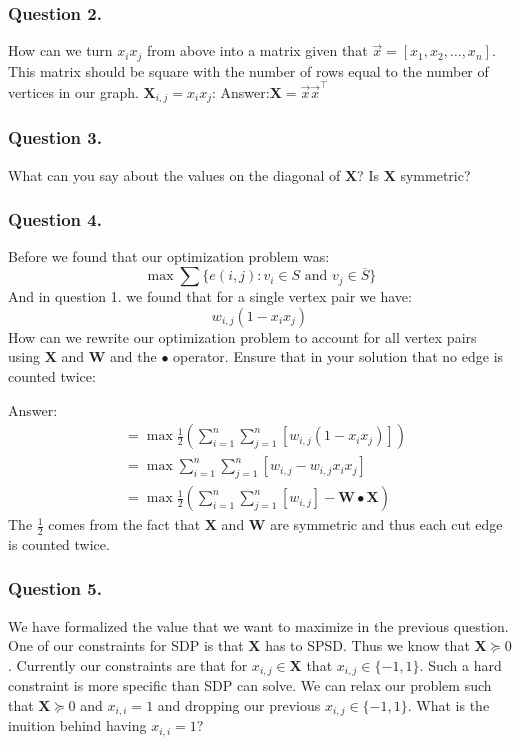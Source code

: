 \documentclass{article}
\begin{document}
\subsubsection{Question 2.}
How can we turn \( x_i x_j \) from above into a matrix given that \( \vec{x} = [x_1, x_2, \ldots, x_n] \). This matrix should be square with the number of rows equal to the number of vertices in our graph. \( \mathbf{X}_{i, j} = x_i x_j \):
Answer:\( \mathbf{X} = \vec{x} \vec{x}^\top \)

\subsubsection{Question 3.}
What can you say about the values on the diagonal of \( \mathbf{X} \)? Is \( \mathbf{X} \) symmetric?

\subsubsection{Question 4.}
Before we found that our optimization problem was:
\[
  \max \sum \{ e(i, j): v_i \in S \text{ and } v_j \in \overline{S} \}
\]
And in question 1. we found that for a single vertex pair we have:
\[
w_{i, j}(1 - x_i x_j)
\]
How can we rewrite our optimization problem to account for all vertex pairs using \( \mathbf{X} \) and \( \mathbf{W} \) and the \( \bullet \) operator.
Ensure that in your solution that no edge is counted twice:

Answer:
\begin{align*}
 &= \max \frac{1}{2} \left (\sum_{i = 1}^n \sum_{j = 1}^n[ w_{i, j}(1 - x_i x_j) ] \right)\\
 &= \max  \sum_{i = 1}^n \sum_{j = 1}^n[ w_{i, j} - w_{i, j} x_i x_j ]\\
 &= \max \frac{1}{2} \left ( \sum_{i = 1}^n \sum_{j = 1}^n[w_{i, j}] - \mathbf{W} \bullet \mathbf{X} \right )
\end{align*}
The \( \frac{1}{2} \) comes from the fact that \( \mathbf{X} \) and \( \mathbf{W} \) are symmetric and thus each cut edge is counted twice.

\subsubsection{Question 5.}
We have formalized the value that we want to maximize in the previous question.
One of our constraints for SDP is that \( \mathbf{X} \) has to SPSD.
Thus we know that \( \mathbf{X} \succeq 0 \).
Currently our constraints are that for \( x_{i, j} \in \mathbf{X} \) that \( x_{i, j} \in \{ -1, 1 \} \).
Such a hard constraint is more specific than SDP can solve.
We can relax our problem such that \( \mathbf{X} \succeq 0\) and \( x_{i, i} = 1 \) and dropping our previous \( x_{i, j} \in \{ -1, 1 \} \).
What is the inuition behind having \( x_{i, i} = 1 \)?
\end{document}
